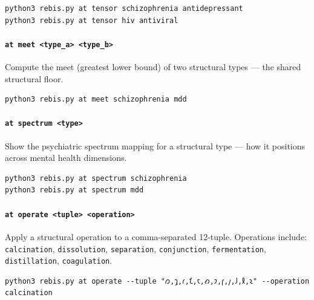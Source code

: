 \begin{verbatim}
python3 rebis.py at tensor schizophrenia antidepressant
python3 rebis.py at tensor hiv antiviral
\end{verbatim}

\hypertarget{at-meet-type_a-type_b}{%
\paragraph{\texorpdfstring{\texttt{at\ meet\ \textless{}type\_a\textgreater{}\ \textless{}type\_b\textgreater{}}}{at meet \textless type\_a\textgreater{} \textless type\_b\textgreater{}}}\label{at-meet-type_a-type_b}}

Compute the meet (greatest lower bound) of two structural types --- the
shared structural floor.

\begin{verbatim}
python3 rebis.py at meet schizophrenia mdd
\end{verbatim}

\hypertarget{at-spectrum-type}{%
\paragraph{\texorpdfstring{\texttt{at\ spectrum\ \textless{}type\textgreater{}}}{at spectrum \textless type\textgreater{}}}\label{at-spectrum-type}}

Show the psychiatric spectrum mapping for a structural type --- how it
positions across mental health dimensions.

\begin{verbatim}
python3 rebis.py at spectrum schizophrenia
python3 rebis.py at spectrum mdd
\end{verbatim}

\hypertarget{at-operate-tuple-operation}{%
\paragraph{\texorpdfstring{\texttt{at\ operate\ \textless{}tuple\textgreater{}\ \textless{}operation\textgreater{}}}{at operate \textless tuple\textgreater{} \textless operation\textgreater{}}}\label{at-operate-tuple-operation}}

Apply a structural operation to a comma-separated 12-tuple. Operations
include: \texttt{calcination}, \texttt{dissolution},
\texttt{separation}, \texttt{conjunction}, \texttt{fermentation},
\texttt{distillation}, \texttt{coagulation}.

\begin{verbatim}
python3 rebis.py at operate --tuple "𐑼,𐑡,𐑩,𐑗,𐑱,𐑺,𐑲,𐑝,𐑢,𐑓,𐑙,𐑷" --operation calcination
\end{verbatim}

